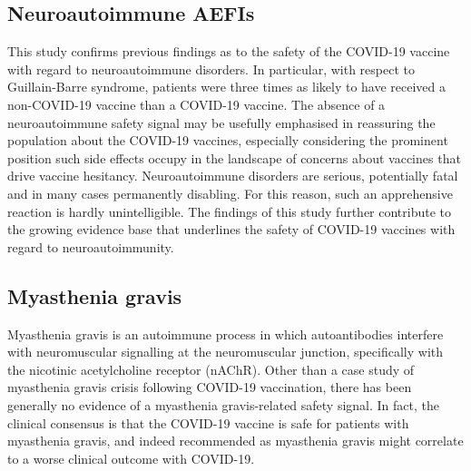 \documentclass{article}
\begin{document}
\subsection{Neuroautoimmune AEFIs}

This study confirms previous findings as to the safety of the COVID-19 vaccine with regard to neuroautoimmune disorders.\cite{von2021vaers}
In particular, with respect to Guillain-Barre syndrome, patients were three times as likely to have received a non-COVID-19 vaccine than a COVID-19 vaccine.
The absence of a neuroautoimmune safety signal may be usefully emphasised in reassuring the population about the COVID-19 vaccines, especially considering the prominent position such side effects occupy in the landscape of concerns about vaccines that drive vaccine hesitancy.\cite{berry2021lessons}
Neuroautoimmune disorders are serious, potentially fatal and in many cases permanently disabling.
For this reason, such an apprehensive reaction is hardly unintelligible.
The findings of this study further contribute to the growing evidence base that underlines the safety of COVID-19 vaccines with regard to neuroautoimmunity.

\subsection{Myasthenia gravis}

Myasthenia gravis is an autoimmune process in which autoantibodies interfere with neuromuscular signalling at the neuromuscular junction, specifically with the nicotinic acetylcholine receptor (nAChR).\cite{conti2006myasthenia}
Other than a case study of myasthenia gravis crisis following COVID-19 vaccination,\cite{Tagliaferri_2021} there has been generally no evidence of a myasthenia gravis-related safety signal.
In fact, the clinical consensus is that the COVID-19 vaccine is safe for patients with myasthenia gravis, and indeed recommended as myasthenia gravis might correlate to a worse clinical outcome with COVID-19.\cite{jacob2020guidance,vzivkovic2021doctor}
\end{document}
